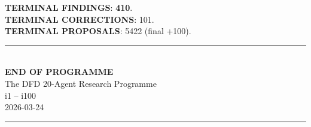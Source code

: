 \documentclass[11pt,a4paper]{article}
\begin{document}
\textbf{TERMINAL FINDINGS}: \textbf{410}.\\
\textbf{TERMINAL CORRECTIONS}: 101.\\
\textbf{TERMINAL PROPOSALS}: 5422 (final +100).

\vspace{24pt}
\begin{center}
\rule{0.8\textwidth}{2pt}\\[12pt]
\Large\textbf{END OF PROGRAMME}\\[6pt]
\normalsize
The DFD 20-Agent Research Programme\\
i1 -- i100\\
2026-03-24\\[6pt]
\rule{0.8\textwidth}{2pt}
\end{center}
\end{document}
